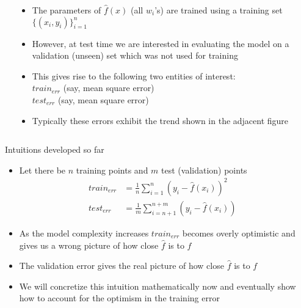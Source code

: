 \begin{frame}
	\begin{columns}
		\begin{column}{0.4\textwidth}
			\onslide<4->{
				
			}
			
		\end{column}
		\begin{column}{0.6\textwidth}
			\begin{itemize}
				\justifying
				\setlength\itemsep{1em}
				\item<1-> The parameters of $\hat{f}(x)$ (all $w_i$'s) are trained using a training set $\{(x_i,y_i)\}_{i=1}^{n}$
				\item<2-> However, at test time we are interested in evaluating the model on a validation (unseen) set which was not used for training
										
				\item<3-> This gives rise to the following two entities of interest:\\
				\color{blue}	$train_{err}$	(say, mean square error)\\
				\color{red} $test_{err}$ (say, mean square error)
										
				\item<4-> Typically these errors exhibit the trend shown in the adjacent figure
			\end{itemize}
		\end{column}
	\end{columns}
\end{frame}
\begin{frame}{}
	\begin{block}{Intuitions developed so far}
					
					
		\begin{itemize}
			\justifying
			\setlength\itemsep{1em}
			\item<1-> Let there be $n$ training points and $m$ test (validation) points	
			\begin{align*}
				train_{err} & = \frac{1}{n}\sum_{i=1}^{n}(y_i-\hat{f}(x_i))^2   &   \\
				test_{err}  & = \frac{1}{m}\sum_{i=n+1}^{n+m}(y_i-\hat{f}(x_i)) &   
			\end{align*}
			\item<2-> As the model complexity increases $train_{err}$ becomes overly optimistic and gives us a wrong picture of how close $\hat{f}$ is to $f$
			\item<3-> The validation error gives the real picture of how close $\hat{f}$ is to $f$
			\item<4-> We will concretize this intuition mathematically now and eventually show how to account for the optimism in the training error
		\end{itemize}			
	\end{block}
\end{frame}
